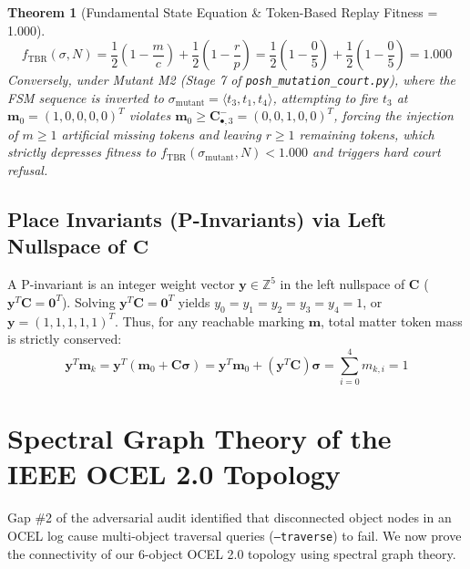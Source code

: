 \documentclass[10pt,twoside,openany]{book}
\theoremstyle{plain}
\newtheorem{theorem}{Theorem}[chapter]
\theoremstyle{definition}
\theoremstyle{remark}
\newcommand{\Z}{\mathbb{Z}}
\begin{document}
\begin{theorem}[Fundamental State Equation \& Token-Based Replay Fitness = 1.000]
\begin{equation}
f_{\mathrm{TBR}}(\sigma, N) = \frac{1}{2}\left( 1 - \frac{m}{c} \right) + \frac{1}{2}\left( 1 - \frac{r}{p} \right) = \frac{1}{2}\left( 1 - \frac{0}{5} \right) + \frac{1}{2}\left( 1 - \frac{0}{5} \right) = 1.000
\end{equation}
Conversely, under Mutant M2 (Stage 7 of \texttt{posh\_mutation\_court.py}), where the FSM sequence is inverted to $\sigma_{\mathrm{mutant}} = \langle t_3, t_1, t_4 \rangle$, attempting to fire $t_3$ at $\mathbf{m}_0 = (1, 0, 0, 0, 0)^T$ violates $\mathbf{m}_0 \ge \mathbf{C}^-_{\bullet, 3} = (0, 0, 1, 0, 0)^T$, forcing the injection of $m \ge 1$ artificial missing tokens and leaving $r \ge 1$ remaining tokens, which strictly depresses fitness to $f_{\mathrm{TBR}}(\sigma_{\mathrm{mutant}}, N) < 1.000$ and triggers hard court refusal.
\end{theorem}

\subsection{Place Invariants (P-Invariants) via Left Nullspace of $\mathbf{C}$}
A P-invariant is an integer weight vector $\mathbf{y} \in \Z^5$ in the left nullspace of $\mathbf{C}$ ($\mathbf{y}^T \mathbf{C} = \mathbf{0}^T$). Solving $\mathbf{y}^T \mathbf{C} = \mathbf{0}^T$ yields $y_0 = y_1 = y_2 = y_3 = y_4 = 1$, or $\mathbf{y} = (1, 1, 1, 1, 1)^T$. Thus, for any reachable marking $\mathbf{m}$, total matter token mass is strictly conserved:
\begin{equation}
\mathbf{y}^T \mathbf{m}_k = \mathbf{y}^T (\mathbf{m}_0 + \mathbf{C}\boldsymbol{\sigma}) = \mathbf{y}^T \mathbf{m}_0 + (\mathbf{y}^T \mathbf{C})\boldsymbol{\sigma} = \sum_{i=0}^4 m_{k,i} = 1
\end{equation}

\section{Spectral Graph Theory of the IEEE OCEL 2.0 Topology}
Gap \#2 of the adversarial audit identified that disconnected object nodes in an OCEL log cause multi-object traversal queries (\texttt{--traverse}) to fail. We now prove the connectivity of our 6-object OCEL 2.0 topology using spectral graph theory.
\end{document}
